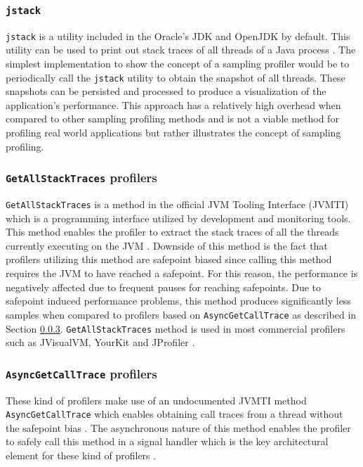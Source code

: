 \documentclass[..thesis.tex]{subfiles}
\begin{document}
\subsubsection{\texttt{jstack}}
\texttt{jstack} is a utility included in the Oracle's JDK and OpenJDK by default. This utility can be used to print out stack traces of all threads of a Java process \cite{jstack}. The simplest implementation to show the concept of a sampling profiler would be to periodically call the \texttt{jstack} utility to obtain the snapshot of all threads. These snapshots can be persisted and processed to produce a visualization of the application's performance. This approach has a relatively high overhead when compared to other sampling profiling methods and is not a viable method for profiling real world applications but rather illustrates the concept of sampling profiling.

\subsubsection{\texttt{GetAllStackTraces} profilers}
\texttt{GetAllStackTraces} is a method in the official JVM Tooling Interface (JVMTI) which is a programming interface utilized by development and monitoring tools. This method enables the profiler to extract the stack traces of all the threads currently executing on the JVM \cite{jvmtm}. Downside of this method is the fact that profilers utilizing this method are safepoint biased since calling this method requires the JVM to have reached a safepoint. For this reason, the performance is negatively affected due to frequent pauses for reaching safepoints.
Due to safepoint induced performance problems, this method produces significantly less samples when compared to profilers based on \texttt{Async\-Get\-Call\-Trace} as described in Section \ref{sec:asgct}. 
\texttt{GetAllStackTraces} method is used in most commercial profilers such as JVisualVM, YourKit and JProfiler \cite{wakart_psychosomatic_2016, visualvm}.  


\subsubsection{\texttt{AsyncGetCallTrace} profilers}
\label{sec:asgct}

These kind of profilers make use of an undocumented JVMTI method \texttt{Async\-Get\-Call\-Trace} which enables obtaining call traces from a thread without the safepoint bias \cite{agct_source}. The asynchronous nature of this method enables the profiler to safely call this method in a signal handler which is the key architectural element for these kind of profilers \cite{signal-safety7}.
\end{document}
